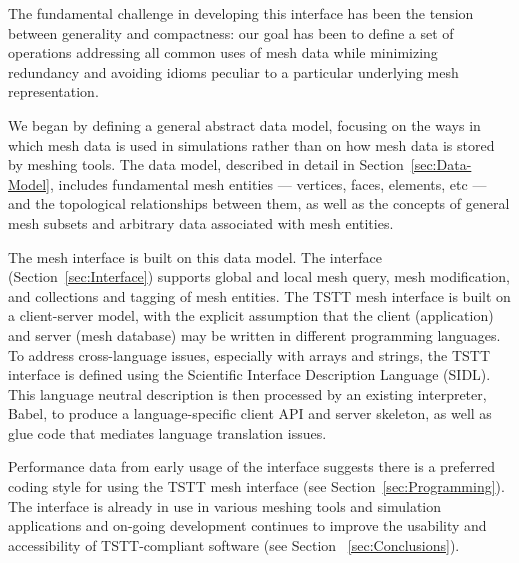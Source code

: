 The fundamental challenge in developing this interface has been the
tension between generality and compactness: our goal has been to define
a set of operations addressing all common uses of mesh data while
minimizing redundancy and avoiding idioms peculiar to a particular
underlying mesh representation.

We began by defining a general abstract data model, focusing on the ways
in which mesh data is used in simulations rather than on how mesh data
is stored by meshing tools.  The data model, described in detail in
Section~\ref{sec:Data-Model}, includes fundamental mesh entities ---
vertices, faces, elements, etc --- and the topological relationships
between them, as well as the concepts of general mesh subsets and
arbitrary data associated with mesh entities.

The mesh interface is built on this data model.  The interface
(Section~\ref{sec:Interface}) supports global and local mesh query, mesh
modification, and collections and tagging of mesh entities.  
The TSTT mesh interface is built on a client-server model, with the
explicit assumption that the client (application) and server (mesh
database) may be written in different programming languages.  To address
cross-language issues, especially with arrays and strings, the TSTT
interface is defined using the Scientific Interface Description Language
(SIDL)\cite{babel:site05,babel:usersguide05}.  This language neutral
description is then processed by an existing interpreter, Babel, to
produce a language-specific client API and server skeleton, as well as
glue code that mediates language translation issues.

Performance data from early usage of the interface suggests there is a
preferred coding style for using the TSTT mesh interface (see
Section~\ref{sec:Programming}).  The interface is already in use in
various meshing tools and simulation applications and on-going
development continues to improve the usability and accessibility of
TSTT-compliant software (see Section ~\ref{sec:Conclusions}).

